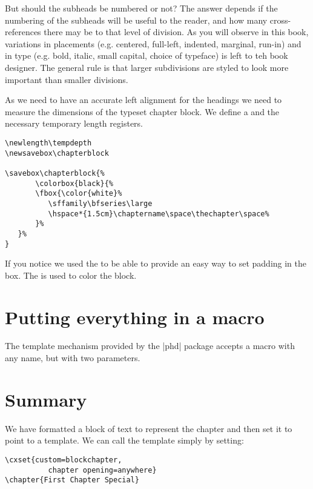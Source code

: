 But should the subheads be numbered or not? The answer depends if the numbering of the subheads will be useful to the reader, and how many cross-references there may be to that level of division. As you will observe in this book, variations in placements (e.g. centered, full-left, indented, marginal, run-in) and in type (e.g. bold, italic, small capital, choice of typeface) is left to teh book designer. The general rule is that larger subdivisions are styled to look more important than smaller divisions.





As we need to have an accurate left alignment for the headings we need to measure the dimensions of the 
typeset chapter block. We define a \cmd{\newsavebox} and the necessary temporary length registers.

\begin{scriptexample}{}{}
\begin{verbatim}
\newlength\tempdepth
\newsavebox\chapterblock

\savebox\chapterblock{%
       \colorbox{black}{%
       \fbox{\color{white}% 
          \sffamily\bfseries\large
          \hspace*{1.5cm}\chaptername\space\thechapter\space%
       }%
   }%
}
\end{verbatim}
\end{scriptexample}

If you notice we used the \cmd{\fbox}  to be able to provide an easy way to set padding in the box. The
 is used to color the block. 

\section{Putting everything in a macro}

The template mechanism provided by the |phd| package accepts a macro with any name, but with two parameters.



\section{Summary}

We have formatted a block of text to represent the chapter and then set it to point to a template. We can call the template simply by setting:

\begin{verbatim}
\cxset{custom=blockchapter,
          chapter opening=anywhere}
\chapter{First Chapter Special}
\end{verbatim}

